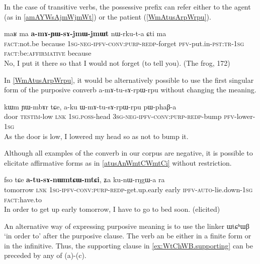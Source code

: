 \documentclass[oldfontcommands,oneside,a4paper,11pt]{article}
\newcommand{\ipa}[1]{{\phon \mbox{#1}}} %
\begin{document}
In the case of transitive verbs, the possessive prefix can refer either to the agent (as in \ref{amAYWsAjmWjmWt}) or the patient (\ref{WmAtusArpWrpu}).

\begin{exe}
\ex \label{amAYWsAjmWjmWt}
\gll 
\ipa{maʁ}   	\ipa{ma}   	\ipa{\textbf{a-mɤ-ɲɯ-sɤ-jmɯ-jmɯt}}   	\ipa{nɯ-rku-t-a}   	\ipa{ɕti}   	\ipa{ma}   \\
\textsc{fact}:not.be because \textsc{1sg-neg-ipfv-conv:purp-redp}-forget \textsc{pfv}-put.in-\textsc{pst:tr-1sg} \textsc{fact}:be:\textsc{affirmative} because \\
\glt No, I put it there so that I would not forget (to tell you). (The frog, 172)
\end{exe}

In \ref{WmAtusArpWrpu}, it would be alternatively possible to use the first singular form of the purposive converb \ipa{a-mɤ-tu-sɤ-rpɯ-rpu}   without changing the meaning.

 \begin{exe}
\ex \label{WmAtusArpWrpu}
\gll 
\ipa{kɯm}    	\ipa{ɲɯ-mbɤr}    	\ipa{tɕe,}    	\ipa{a-ku}    	\ipa{ɯ-mɤ-tu-sɤ-rpɯ-rpu}    	\ipa{pɯ-phaβ-a}    \\
door \textsc{testim}-low \textsc{lnk} \textsc{1sg.poss}-head \textsc{3sg-neg-ipfv-conv:purp-redp}-bump \textsc{pfv}-lower-\textsc{1sg}\\
\glt As the door is low, I lowered my head so as not to bump it.
\end{exe}

Although all examples of the converb in our corpus are negative, it is possible to elicitate affirmative forms  as in \ref{atusAnWmtCWmtCi} without restriction.

\begin{exe}
\ex \label{atusAnWmtCWmtCi}
\gll
 \ipa{fso}   	\ipa{tɕe}   	\ipa{\textbf{a-tu-sɤ-nɯmtɕɯ-mtɕi},}   	\ipa{ʑa}   	\ipa{ku-nɯ-rŋgɯ-a}   	\ipa{ra}  \\
tomorrow \textsc{lnk} \textsc{1sg-ipfv-conv:purp-redp}-get.up.early early \textsc{ipfv-auto}-lie.down-\textsc{1sg} \textsc{fact}:have.to 
\\
\glt In order to get up early tomorrow, I have to go to bed soon. (elicited) 
\end{exe}

 An alternative way of expressing purposive meaning is to use the linker \ipa{ɯtɕʰɯβ} `in order to'  after the purposive clause. The verb  an be either in a finite form or in the infinitive.  Thus, the supporting clause in \ref{ex:WtChWB.supporting}  can be preceded by any of  (a)-(c).  
 
\end{document}
